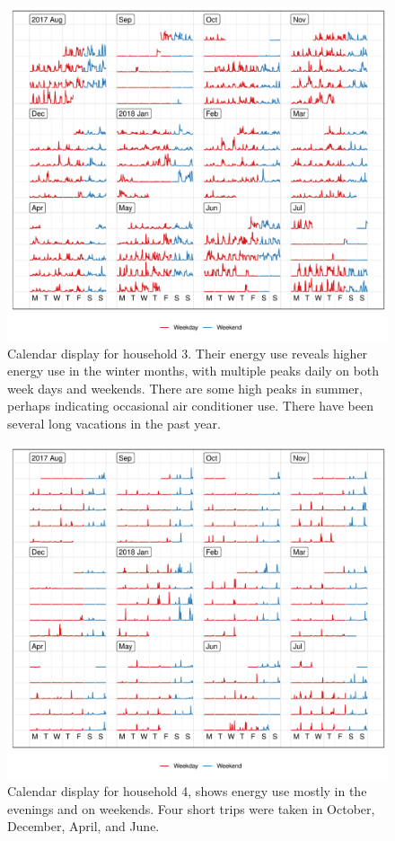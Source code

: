 \documentclass[12pt]{article}
\begin{document}
\begin{figure}

{\centering \includegraphics[width=\textwidth]{figure/h3-1} 

}

\caption{Calendar display for household 3. Their energy use reveals higher energy use in the winter months, with multiple peaks daily on both week days and weekends. There are some high peaks in summer, perhaps indicating occasional air conditioner use. There have been several long vacations in the past year.}\label{fig:h3}
\end{figure}

\begin{figure}

{\centering \includegraphics[width=\textwidth]{figure/h4-1} 

}

\caption{Calendar display for household 4, shows energy use mostly in the evenings and on weekends. Four short trips were taken in October, December, April, and June.}\label{fig:h4}
\end{figure}
\end{document}
